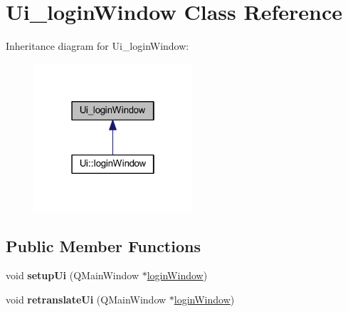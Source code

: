 \hypertarget{class_ui__login_window}{}\section{Ui\+\_\+login\+Window Class Reference}
\label{class_ui__login_window}


Inheritance diagram for Ui\+\_\+login\+Window\+:
\nopagebreak
\begin{figure}[H]
\begin{center}
\leavevmode
\includegraphics[width=166pt]{class_ui__login_window__inherit__graph}
\end{center}
\end{figure}
\subsection*{Public Member Functions}
\begin{DoxyCompactItemize}
\item 
\mbox{\label{class_ui__login_window_ad001da98112f6270b089da79759bdb28}} 
void {\bfseries setup\+Ui} (Q\+Main\+Window $\ast$\hyperlink{classlogin_window}{login\+Window})
\item 
\mbox{\label{class_ui__login_window_a9d43d9388ae4342b3cfec17466c3d55d}} 
void {\bfseries retranslate\+Ui} (Q\+Main\+Window $\ast$\hyperlink{classlogin_window}{login\+Window})
\end{DoxyCompactItemize}
